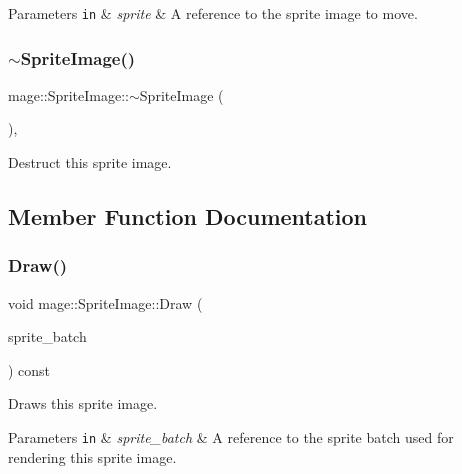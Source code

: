 \begin{DoxyParams}[1]{Parameters}
\mbox{\tt in}  & {\em sprite} & A reference to the sprite image to move. \\
\hline
\end{DoxyParams}
\hypertarget{classmage_1_1_sprite_image_a9121ee110f7e64ee6e936e0d3350ab44}{}\label{classmage_1_1_sprite_image_a9121ee110f7e64ee6e936e0d3350ab44} 
\subsubsection{\texorpdfstring{$\sim$\+Sprite\+Image()}{~SpriteImage()}}
{\footnotesize\ttfamily mage\+::\+Sprite\+Image\+::$\sim$\+Sprite\+Image (\begin{DoxyParamCaption}{ }\end{DoxyParamCaption})\hspace{0.3cm}{\ttfamily [virtual]}, {\ttfamily [default]}}

Destruct this sprite image. 

\subsection{Member Function Documentation}
\hypertarget{classmage_1_1_sprite_image_ae30d3293931f674fea17008063755bb6}{}\label{classmage_1_1_sprite_image_ae30d3293931f674fea17008063755bb6} 
\subsubsection{\texorpdfstring{Draw()}{Draw()}}
{\footnotesize\ttfamily void mage\+::\+Sprite\+Image\+::\+Draw (\begin{DoxyParamCaption}\item[{\hyperlink{classmage_1_1_sprite_batch}{Sprite\+Batch} \&}]{sprite\+\_\+batch }\end{DoxyParamCaption}) const}

Draws this sprite image.


\begin{DoxyParams}[1]{Parameters}
\mbox{\tt in}  & {\em sprite\+\_\+batch} & A reference to the sprite batch used for rendering this sprite image. \\
\hline
\end{DoxyParams}
\hypertarget{classmage_1_1_sprite_image_a0362a937253ba7a5cd944210aafd9288}{}\label{classmage_1_1_sprite_image_a0362a937253ba7a5cd944210aafd9288} 
